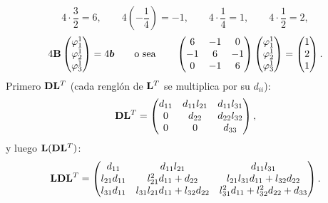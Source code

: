 \[
4\cdot\frac32 = 6, \qquad 4\left(-\frac14\right) = -1, \qquad
4\cdot\frac14 = 1, \qquad 4\cdot\frac12 = 2,
\]
\[
4\mathbf{B}\begin{pmatrix} \varphi_1^1\\ \varphi_2^1\\ \varphi_3^1 \end{pmatrix} = 4\bm{b}
\qquad\text{o sea}\qquad
\begin{pmatrix} 6 & -1 & 0\\ -1 & 6 & -1\\ 0 & -1 & 6 \end{pmatrix}
\begin{pmatrix} \varphi_1^1\\ \varphi_2^1\\ \varphi_3^1 \end{pmatrix}
= \begin{pmatrix} 1\\ 2\\ 1 \end{pmatrix} .
\]
Primero $\mathbf{D}\mathbf{L}^T$ (cada renglón de $\mathbf{L}^T$ se multiplica por su $d_{ii}$):
\[
  \mathbf{D}\mathbf{L}^T = \begin{pmatrix} d_{11} & d_{11}l_{21} & d_{11}l_{31}\\ 0 & d_{22} & d_{22}l_{32}\\ 0 & 0 & d_{33} \end{pmatrix},
\]
y luego $\mathbf{L}(\mathbf{D}\mathbf{L}^T)$:
\[
  \mathbf{L}\mathbf{D}\mathbf{L}^T =
  \begin{pmatrix}
    d_{11} & d_{11}l_{21} & d_{11}l_{31}\\
    l_{21}d_{11} & l_{21}^2 d_{11} + d_{22} & l_{21}l_{31}d_{11} + l_{32}d_{22}\\
    l_{31}d_{11} & l_{31}l_{21}d_{11} + l_{32}d_{22} & l_{31}^2 d_{11} + l_{32}^2 d_{22} + d_{33}
  \end{pmatrix}.
\]

